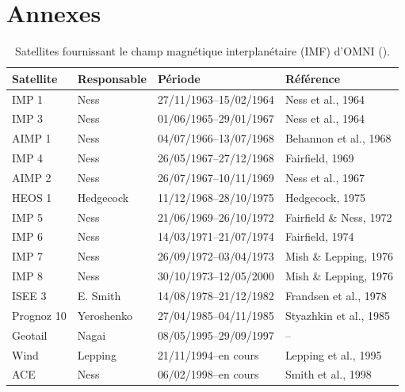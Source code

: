 \section*{Annexes}



\begin{table}[ht]
\centering
\footnotesize
\setlength{\tabcolsep}{4pt}
\begin{tabular}{llll}
\hline
\textbf{Satellite} & \textbf{Responsable} & \textbf{Période} & \textbf{Référence} \\
\hline
IMP 1 & Ness & 27/11/1963--15/02/1964 & Ness et al., 1964 \\
IMP 3 & Ness & 01/06/1965--29/01/1967 & Ness et al., 1964 \\
AIMP 1 & Ness & 04/07/1966--13/07/1968 & Behannon et al., 1968 \\
IMP 4 & Ness & 26/05/1967--27/12/1968 & Fairfield, 1969 \\
AIMP 2 & Ness & 26/07/1967--10/11/1969 & Ness et al., 1967 \\
HEOS 1 & Hedgecock & 11/12/1968--28/10/1975 & Hedgecock, 1975 \\
IMP 5 & Ness & 21/06/1969--26/10/1972 & Fairfield \& Ness, 1972 \\
IMP 6 & Ness & 14/03/1971--21/07/1974 & Fairfield, 1974 \\
IMP 7 & Ness & 26/09/1972--03/04/1973 & Mish \& Lepping, 1976 \\
IMP 8 & Ness & 30/10/1973--12/05/2000 & Mish \& Lepping, 1976 \\
ISEE 3 & E. Smith & 14/08/1978--21/12/1982 & Frandsen et al., 1978 \\
Prognoz 10 & Yeroshenko & 27/04/1985--04/11/1985 & Styazhkin et al., 1985 \\
Geotail & Nagai & 08/05/1995--29/09/1997 & -- \\
Wind & Lepping & 21/11/1994--en cours & Lepping et al., 1995 \\
ACE & Ness & 06/02/1998--en cours & Smith et al., 1998 \\
\hline
\end{tabular}
\caption{Satellites fournissant le champ magnétique interplanétaire (IMF) d'OMNI (\cite{SPDF_OMNIWeb}).}
\label{tab:omni_imf}
\end{table}

